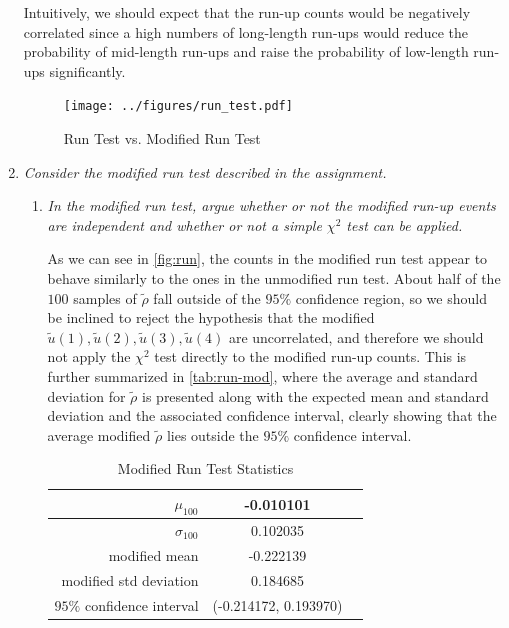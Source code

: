 \documentclass{article}
\begin{document}
\begin{enumerate}
        Intuitively, we should expect that the run-up counts would be negatively correlated
        since a high numbers of long-length run-ups would reduce the probability of mid-length run-ups and raise the probability of low-length run-ups significantly.

        \begin{figure}[H]
            \centering
            \caption{Run Test vs. Modified Run Test}
            \texttt{[image: ../figures/run\_test.pdf]}
            \label{fig:run}
        \end{figure}

    \item
        {\it Consider the modified run test described in the assignment.}
        \begin{enumerate}
            \item
                {\it In the modified run test,
                argue whether or not the modified run-up events are independent and whether or not a simple $\chi^2$ test can be applied.}

                As we can see in \autoref{fig:run}, the counts in the modified run test appear to behave similarly to the ones in the unmodified run test.
                About half of the $100$ samples of $\tilde{\rho}$ fall outside of the $95\%$ confidence region, so we should be inclined to reject the hypothesis that
                the modified $\tilde{u}(1), \tilde{u}(2), \tilde{u}(3), \tilde{u}(4)$ are uncorrelated, and therefore we should not apply the $\chi^2$ test directly
                to the modified run-up counts.
                This is further summarized in \autoref{tab:run-mod}, where the average and standard deviation for $\tilde{\rho}$ is presented along with the
                expected mean and standard deviation and the associated confidence interval,
                clearly showing that the average modified $\tilde{\rho}$ lies outside the $95\%$ confidence interval.

                \begin{table}[H]
                    \centering
                    \caption{Modified Run Test Statistics}
                    \begin{tabular}{|r|c|c|} \hline
                        \multicolumn{1}{|r|}{$\mu_{100}$}                   & \multicolumn{1}{|c|}{-0.010101}   \\ \hline
                        \multicolumn{1}{|r|}{$\sigma_{100}$}                & \multicolumn{1}{|c|}{0.102035}    \\ \hline
                        \multicolumn{1}{|r|}{modified mean}                 & \multicolumn{1}{|c|}{-0.222139}   \\ \hline
                        \multicolumn{1}{|r|}{modified std deviation}        & \multicolumn{1}{|c|}{0.184685}    \\ \hline
                        \multicolumn{1}{|r|}{$95\%$ confidence interval}    & \multicolumn{1}{|c|}{(-0.214172, 0.193970)}    \\ \hline
                    \end{tabular}
                    \label{tab:run-mod}
                \end{table}


\end{enumerate}
\end{enumerate}
\end{document}
